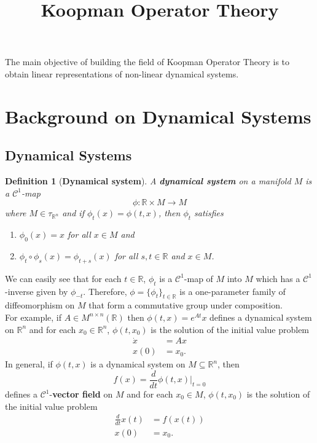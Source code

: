 \documentclass[]{article}
\title{Koopman Operator Theory}
\author{}
\date{}
\newtheorem{definition}{Definition}
\begin{document}
\maketitle

The main objective of building the field of Koopman Operator Theory is to obtain linear representations of non-linear dynamical systems.

\section{Background on Dynamical Systems}
\subsection{Dynamical Systems}
\begin{definition}[\textbf{Dynamical system}]
A \textbf{dynamical system} on a manifold $M$ is a $\mathcal{C}^1$-map 
\begin{equation}
	\phi: \mathbb{R} \times M \to M
\end{equation}
where $M \in \tau_{\mathbb{R}^n}$ and if $\phi_t(x)=\phi(t,x)$, then $\phi_t$ satisfies
\begin{enumerate}
	\item $\phi_0(x)=x$ for all $x \in M$ and 
	\item $\phi_t \circ \phi_s (x) = \phi_{t+s}(x)$ for all $s,t \in \mathbb{R}$ and $x \in M$.
\end{enumerate}
\end{definition}
We can easily see that for each $t \in \mathbb{R}$, $\phi_t$ is a $\mathcal{C}^1$-map of $M$ into $M$ which has a $\mathcal{C}^1$-inverse given by $\phi_{-t}$. Therefore, $\phi = \{\phi_t\}_{t \in \mathbb{R}}$ is a one-parameter family of diffeomorphism on $M$ that form a commutative group under composition. \\
For example, if $A \in M^{n \times n}(\mathbb{R})$ then $\phi(t,x)=e^{At}x$ defines a dynamical system on $\mathbb{R}^n$ and for each $x_0 \in \mathbb{R}^n$, $\phi(t,x_0)$ is the solution of the initial value problem
\begin{equation}
	\begin{split}
		\dot{x} & = Ax \\
		x(0) & = x_0.
	\end{split}
\end{equation}
In general, if $\phi(t,x)$ is a dynamical system on $M \subseteq \mathbb{R}^n$, then
\begin{equation}
	f(x)=\frac{d}{dt}\phi(t,x)\bigg|_{t=0}
\end{equation}
defines a $\mathcal{C}^1$-\textbf{vector field} on $M$ and for each $x_0 \in M$, $\phi(t,x_0)$ is the solution of the initial value problem
\begin{equation}
	\begin{split}
		\frac{d}{dt} x(t) & = f(x(t)) \\
		x(0) & = x_0.
	\end{split}
\end{equation}
\end{document}
